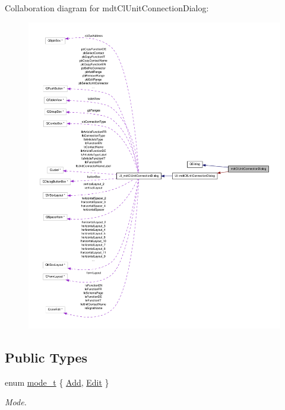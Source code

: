Collaboration diagram for mdt\-Cl\-Unit\-Connection\-Dialog\-:
\nopagebreak
\begin{figure}[H]
\begin{center}
\leavevmode
\includegraphics[width=350pt]{classmdt_cl_unit_connection_dialog__coll__graph}
\end{center}
\end{figure}
\subsection*{Public Types}
\begin{DoxyCompactItemize}
\item 
enum \hyperlink{classmdt_cl_unit_connection_dialog_a754889f1591eddb79b69de4c51532f43}{mode\-\_\-t} \{ \hyperlink{classmdt_cl_unit_connection_dialog_a754889f1591eddb79b69de4c51532f43a65365660e45940b053efbf543aa2c10c}{Add}, 
\hyperlink{classmdt_cl_unit_connection_dialog_a754889f1591eddb79b69de4c51532f43a855eaf8093ea6043e46688cc5115643f}{Edit}
 \}
\begin{DoxyCompactList}\small\item\em Mode. \end{DoxyCompactList}\end{DoxyCompactItemize}
